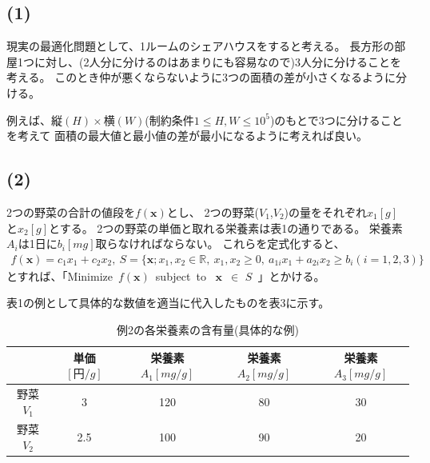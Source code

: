 \documentclass[12pt]{jarticle}
\begin{document}
\subsection*{(1)}
現実の最適化問題として、1ルームのシェアハウスをすると考える。
長方形の部屋1つに対し、(2人分に分けるのはあまりにも容易なので)3人分に分けることを考える。
このとき仲が悪くならないように3つの面積の差が小さくなるように分ける。

例えば、$縦(H)\times 横(W)$(制約条件$1\leq H,W \leq 10^5$)のもとで3つに分けることを考えて
面積の最大値と最小値の差が最小になるように考えれば良い。

\clearpage
\subsection*{(2)}
2つの野菜の合計の値段を$f(\boldsymbol{x})$とし、
2つの野菜($V_1$,$V_2$)の量をそれぞれ$x_1[g]$と$x_2[g]$とする。
2つの野菜の単価と取れる栄養素は表1の通りである。
栄養素$A_i$は1日に$b_i[mg]$取らなければならない。
これらを定式化すると、
\begin{eqnarray}
    f(\boldsymbol{x})=c_1 x_1 +c_2 x_2,\ S=\{\boldsymbol{x};x_1,x_2\in \mathbb{R},\ x_1,x_2\geq 0,\ a_{1i} x_1+a_{2i}x_2\geq b_i(i=1,2,3)\}\nonumber
\end{eqnarray}
とすれば、「Minimize\ $f(\boldsymbol{x})$\ subject\ to \ $\boldsymbol{x}$\ $\in$ $S$\ 」とかける。

表1の例として具体的な数値を適当に代入したものを表3に示す。
\begin{table}[htb]
    \begin{center}
        \caption{例2の各栄養素の含有量(具体的な例)}
        \begin{tabular}{|c|c|c|c|c|}
            \hline
                      & 単価$[円/g]$ & 栄養素$A_1[mg/g]$ & 栄養素$A_2[mg/g]$ & 栄養素$A_3[mg/g]$ \\
            \hline
            野菜$V_1$ & 3            & 120               & 80                & 30                \\
            野菜$V_2$ & 2.5          & 100               & 90                & 20                \\
            \hline
        \end{tabular}
    \end{center}
\end{table}
\end{document}
